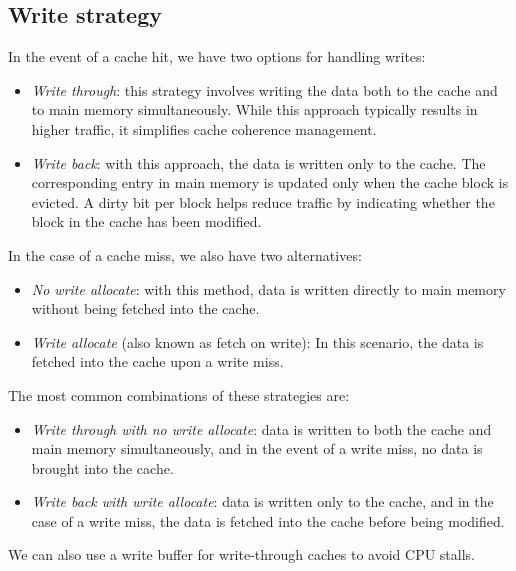 \subsection{Write strategy}
In the event of a cache hit, we have two options for handling writes:
\begin{itemize}
    \item \textit{Write through}: this strategy involves writing the data both to the cache and to main memory simultaneously. 
        While this approach typically results in higher traffic, it simplifies cache coherence management.
    \item \textit{Write back}: with this approach, the data is written only to the cache. 
        The corresponding entry in main memory is updated only when the cache block is evicted. 
        A dirty bit per block helps reduce traffic by indicating whether the block in the cache has been modified.
\end{itemize}
In the case of a cache miss, we also have two alternatives:
\begin{itemize}
    \item \textit{No write allocate}: with this method, data is written directly to main memory without being fetched into the cache.
    \item \textit{Write allocate} (also known as fetch on write): In this scenario, the data is fetched into the cache upon a write miss.
\end{itemize}
The most common combinations of these strategies are:
\begin{itemize}
    \item \textit{Write through with no write allocate}: data is written to both the cache and main memory simultaneously, and in the event of a write miss, no data is brought into the cache.
    \item \textit{Write back with write allocate}: data is written only to the cache, and in the case of a write miss, the data is fetched into the cache before being modified.
\end{itemize}
We can also use a write buffer for write-through caches to avoid CPU stalls. 